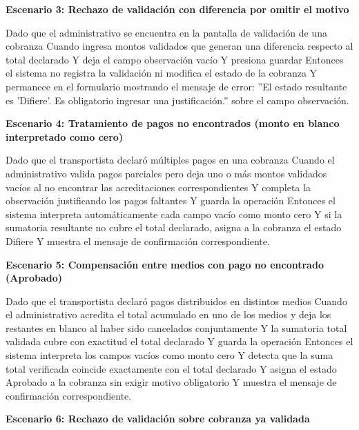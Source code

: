 \documentclass[a4paper,9pt]{article}
\begin{document}
\begin{tcolorbox}[hucard, title={\textbf{HU-49: VALIDAR COBRANZA} \hfill \scriptsize \colorbox{bluestatus}{\textbf{\ New\ }} \quad \colorbox{white}{\textcolor{primarydark}{\textbf{\ 5 pts\ }}}}]
{\noindent\textbf{\textcolor{secondarydark}{Escenario 3:  Rechazo de validación con diferencia por omitir el motivo}}\par\vspace{1pt}
Dado que el administrativo se encuentra en la pantalla de validación de una cobranza Cuando ingresa montos validados que generan una diferencia respecto al total declarado Y deja el campo observación vacío Y presiona guardar Entonces el sistema no registra la validación ni modifica el estado de la cobranza Y permanece en el formulario mostrando el mensaje de error: ''El estado resultante es 'Difiere'. Es obligatorio ingresar una justificación.'' sobre el campo observación.\par\vspace{2.5pt}
\noindent\textbf{\textcolor{secondarydark}{Escenario 4:  Tratamiento de pagos no encontrados (monto en blanco interpretado como cero)}}\par\vspace{1pt}
Dado que el transportista declaró múltiples pagos en una cobranza Cuando el administrativo valida pagos parciales pero deja uno o más montos validados vacíos al no encontrar las acreditaciones correspondientes Y completa la observación justificando los pagos faltantes Y guarda la operación Entonces el sistema interpreta automáticamente cada campo vacío como monto cero Y si la sumatoria resultante no cubre el total declarado, asigna a la cobranza el estado Difiere Y muestra el mensaje de confirmación correspondiente.\par\vspace{2.5pt}
\noindent\textbf{\textcolor{secondarydark}{Escenario 5:  Compensación entre medios con pago no encontrado (Aprobado)}}\par\vspace{1pt}
Dado que el transportista declaró pagos distribuidos en distintos medios Cuando el administrativo acredita el total acumulado en uno de los medios y deja los restantes en blanco al haber sido cancelados conjuntamente Y la sumatoria total validada cubre con exactitud el total declarado Y guarda la operación Entonces el sistema interpreta los campos vacíos como monto cero Y detecta que la suma total verificada coincide exactamente con el total declarado Y asigna el estado Aprobado a la cobranza sin exigir motivo obligatorio Y muestra el mensaje de confirmación correspondiente.\par\vspace{2.5pt}
\noindent\textbf{\textcolor{secondarydark}{Escenario 6:  Rechazo de validación sobre cobranza ya validada}}\par\vspace{1pt}
}
\end{tcolorbox}
\end{document}
